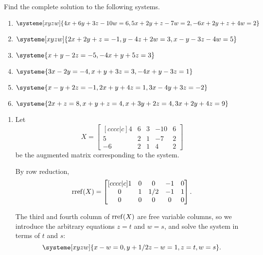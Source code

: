 \begin{exercises}
	\begin{problist}
		\prob Find the complete solution to the following systems.
		\begin{enumerate}
			\item $\systeme[xyzw]{4x+6y+3z-10w=6,5x+2y+z-7w=2,-6x+2y+z+4w=2}$
			\item $\systeme[xyzw]{2x+2y+z=-1,y-4z+2w=3,x-y-3z-4w=5}$
			\item $\systeme{x+y-2z=-5,-4x+y+5z=3}$
			\item $\systeme{3x-2y=-4,x+y+3z=3,-4x+y-3z=1}$
			\item $\systeme{x-y+2z=-1,2x+y+4z=1,3x-4y+3z=-2}$
			\item $\systeme{2x+z=8,x+y+z=4,x+3y+2z=4,3x+2y+4z=9}$
		\end{enumerate}
		\begin{solution}
			\begin{enumerate}
				\item 
				Let
				\[
					X=
					\begin{bmatrix}[cccc|c]
						4 & 6 & 3 & -10 & 6\\
						5 & 2 & 1 & -7 & 2\\
						-6 & 2 & 1 & 4 & 2
					\end{bmatrix}
				\]
				be the augmented matrix corresponding to the system.
				
				By row reduction,
				\[
					\operatorname{rref}(X)=
					\begin{bmatrix}[cccc|c]
						1 & 0 & 0 & -1 & 0\\
						0 & 1 & 1/2 & -1 & 1\\
						0 & 0 & 0 & 0 & 0
					\end{bmatrix}.
				\]
				
				The third and fourth column of $\operatorname{rref}(X)$ are free variable columns,
				so we introduce the arbitrary equations $z=t$ and $w=s$, and
				solve the system in terms of $t$ and $s$:
				\[
					\systeme[xyzw]{x-w=0,y+1/2z-w=1,z=t,w=s}.
				\]
				

\end{enumerate}
\end{solution}
\end{problist}
\end{exercises}
